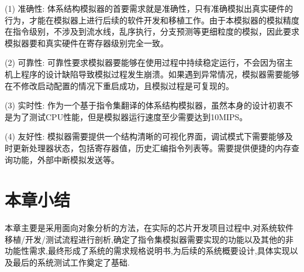 (1) 准确性: 体系结构模拟器的首要需求就是准确性，只有准确模拟出真实硬件的行为，才能在模拟器上进行后续的软件开发和移植工作。由于本模拟器的模拟精度在指令级别，不涉及到流水线，乱序执行，分支预测等更细粒度的模拟，因此要求模拟器要和真实硬件在寄存器级别完全一致。


(2) 可靠性: 可靠性要求模拟器要能够在使用过程中持续稳定运行，不会因为宿主机上程序的设计缺陷导致模拟过程发生崩溃。如果遇到异常情况，模拟器需要能够在不修改启动配置的情况下重启成功，且模拟过程是可复现的。


(3) 实时性: 作为一个基于指令集翻译的体系结构模拟器，虽然本身的设计初衷不是为了测试CPU性能，但是模拟器运行速度至少需要达到10MIPS。


(4) 友好性: 模拟器需要提供一个结构清晰的可视化界面，调试模式下需要能够及时更新处理器状态，包括寄存器值，历史汇编指令列表等。需要提供便捷的内存查询功能，外部中断模拟发送等。




\section{本章小结}

本章主要是采用面向对象分析的方法，在实际的芯片开发项目过程中,对系统软件移植/开发/测试流程进行剖析,确定了指令集模拟器需要实现的功能以及其他的非功能性需求,最终形成了系统的需求规格说明书,为后续的系统概要设计,具体实现以及最后的系统测试工作奠定了基础.


